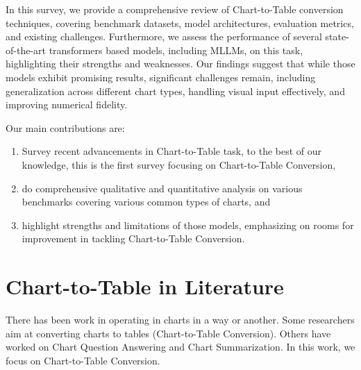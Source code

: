 \documentclass[
	letterpaper, %
]{jdf}
\begin{document}
In this survey, we provide a comprehensive review of Chart-to-Table conversion techniques, covering benchmark datasets, model architectures, evaluation metrics, and existing challenges.
Furthermore, we assess the performance of several state-of-the-art transformers based models, including MLLMs, on this task, highlighting their strengths and weaknesses.
Our findings suggest that while those models exhibit promising results, significant challenges remain, including generalization across different chart types, handling visual input effectively, and improving numerical fidelity.

Our main contributions are:
\begin{enumerate}
     \item Survey recent advancements in Chart-to-Table task, to the best of our knowledge, this is the first survey focusing on Chart-to-Table Conversion,
     \item do comprehensive qualitative and quantitative analysis on various benchmarks covering various common types of charts, and
     \item highlight strengths and limitations  of those models, emphasizing on rooms for improvement in tackling Chart-to-Table Conversion.
       \end{enumerate}
\section{Chart-to-Table in Literature}\label{sect:literature}
There has been work in operating in charts in a way or another.
Some researchers aim at converting charts to tables (Chart-to-Table Conversion).
Others have worked on Chart Question Answering and Chart Summarization.
In this work, we focus on Chart-to-Table Conversion.
\end{document}
